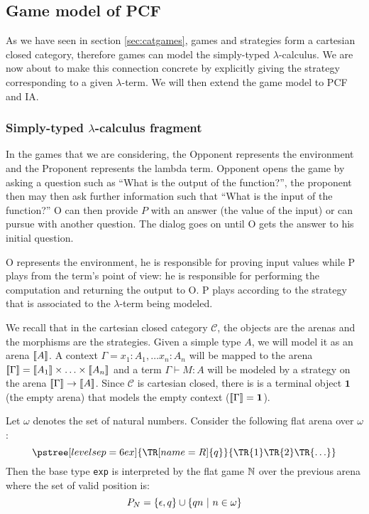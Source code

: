 \subsection{Game model of PCF}
\label{subsec:pcfgamemodel}

As we have seen in section \ref{sec:catgames}, games and strategies
form a cartesian closed category, therefore games can model the
simply-typed $\lambda$-calculus. We are now about to make this
connection concrete by explicitly giving the strategy corresponding
to a given $\lambda$-term. We will then extend the game model to PCF
and IA.

\subsubsection{Simply-typed $\lambda$-calculus fragment}

In the games that we are considering, the Opponent represents the
environment and the Proponent represents the lambda term. Opponent
opens the game by asking a question such as ``What is the output of
the function?'', the proponent then may then ask further information
such that ``What is the input of the function?'' O can then provide
$P$ with an answer (the value of the input) or can pursue with
another question. The dialog goes on until O gets the answer to his
initial question.

O represents the environment, he is responsible for proving input
values while P plays from the term's point of view: he is
responsible for performing the computation and returning the output
to O. P plays according to the strategy that is associated to the
$\lambda$-term being modeled.

We recall that in the cartesian closed category $\mathcal{C}$, the
objects are the arenas and the morphisms are the strategies. Given a
simple type $A$, we will model it as an arena ${[\![ A ]\!]}$. A context
$\Gamma = x_1 :A_1, \ldots x_n:A_n$ will be mapped to the arena
${[\![ \Gamma ]\!]} = {[\![ A_1 ]\!]} \times \ldots \times {[\![A_n ]\!]}$ and a term
$\Gamma \vdash M : A$ will be modeled by a strategy on the arena
${[\![ \Gamma ]\!]} \rightarrow {[\![A ]\!]}$. Since $\mathcal{C}$ is cartesian
closed, there is is a terminal object $\textbf{1}$ (the empty arena)
that models the empty context (${[\![ \Gamma ]\!]} = \textbf{1}$).


Let $\omega$ denotes the set of natural numbers. Consider the
following flat arena over $\omega$:
$$  \pstree[levelsep=6ex]
    {\TR[name=R]{q}}
    { \TR{1} \TR{2} \TR{\ldots}
    }
$$
Then the base type \texttt{exp} is interpreted by the flat game
$\mathbb{N}$ over the previous arena where the set of valid position is:
$$P_N = \{ \epsilon, q \} \cup \{ qn \ | \ n \in \omega \}$$


